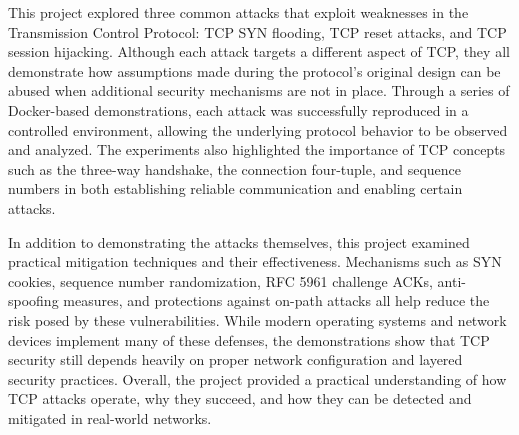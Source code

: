 This project explored three common attacks that exploit weaknesses in the Transmission Control Protocol: TCP SYN flooding, TCP reset attacks, and TCP session hijacking. Although each attack targets a different aspect of TCP, they all demonstrate how assumptions made during the protocol's original design can be abused when additional security mechanisms are not in place. Through a series of Docker-based demonstrations, each attack was successfully reproduced in a controlled environment, allowing the underlying protocol behavior to be observed and analyzed. The experiments also highlighted the importance of TCP concepts such as the three-way handshake, the connection four-tuple, and sequence numbers in both establishing reliable communication and enabling certain attacks.

In addition to demonstrating the attacks themselves, this project examined practical mitigation techniques and their effectiveness. Mechanisms such as SYN cookies, sequence number randomization, RFC 5961 challenge ACKs, anti-spoofing measures, and protections against on-path attacks all help reduce the risk posed by these vulnerabilities. While modern operating systems and network devices implement many of these defenses, the demonstrations show that TCP security still depends heavily on proper network configuration and layered security practices. Overall, the project provided a practical understanding of how TCP attacks operate, why they succeed, and how they can be detected and mitigated in real-world networks.

